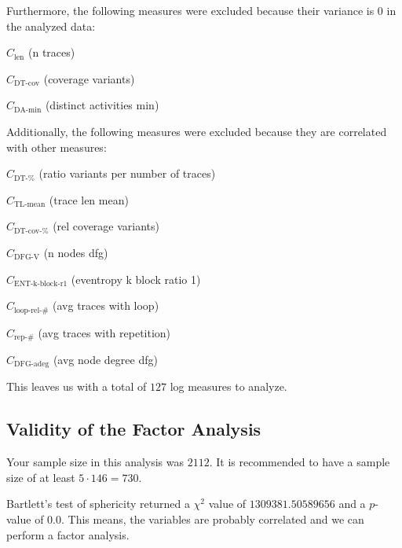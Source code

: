 \documentclass[a4paper]{article}
\newcommand{\lengthname}{\text{len}}
\newcommand{\length}{C_{\lengthname}}
\newcommand{\tlavgname}{\text{TL-mean}}
\newcommand{\tlavg}{C_{\tlavgname}}
\newcommand{\percentageuniquetracesname}{\text{DT-\%}}
\newcommand{\percentageuniquetraces}{C_{\percentageuniquetracesname}}
\newcommand{\dtcovname}{\text{DT-cov}}
\newcommand{\dtcov}{C_{\dtcovname}}
\newcommand{\dtrelcovname}{\text{DT-cov-\%}}
\newcommand{\dtrelcov}{C_{\dtrelcovname}}
\newcommand{\daminname}{\text{DA-min}}
\newcommand{\damin}{C_{\daminname}}
\newcommand{\looprelnumname}{\text{loop-rel-\#}}
\newcommand{\looprelnum}{C_{\looprelnumname}}
\newcommand{\repnumname}{\text{rep-\#}}
\newcommand{\reprelnum}{C_{\repnumname}}
\newcommand{\dfgnodesname}{\text{DFG-V}}
\newcommand{\dfgnodes}{C_{\dfgnodesname}}
\newcommand{\dfgavgdegname}{\text{DFG-adeg}}
\newcommand{\dfgavgdeg}{C_{\dfgavgdegname}}
\newcommand{\entkblockronename}{\text{ENT-k-block-r1}}
\newcommand{\entkblockrone}{C_{\entkblockronename}}
\begin{document}
\bigskip
\noindent
Furthermore, the following measures were excluded because their variance is $0$ in the analyzed data:
\begin{compactenum}
\item $\length$ (n traces)
\item $\dtcov$ (coverage variants)
\item $\damin$ (distinct activities min)
\end{compactenum}

\bigskip
\noindent
Additionally, the following measures were excluded because they are correlated with other measures:
\begin{compactenum}
\item $\percentageuniquetraces$ (ratio variants per number of traces)
\item $\tlavg$ (trace len mean)
\item $\dtrelcov$ (rel coverage variants)
\item $\dfgnodes$ (n nodes dfg)
\item $\entkblockrone$ (eventropy k block ratio 1)
\item $\looprelnum$ (avg traces with loop)
\item $\reprelnum$ (avg traces with repetition)
\item $\dfgavgdeg$ (avg node degree dfg)
\end{compactenum}

\bigskip
\noindent
This leaves us with a total of $127$ log measures to analyze.

\subsection*{Validity of the Factor Analysis}
Your sample size in this analysis was $2112$.
It is recommended to have a sample size of at least $5 \cdot 146 = 730$.

\noindent 
Bartlett's test of sphericity returned a $\chi^2$ value of $1309381.50589656$ and a $p$-value of $0.0$.
This means, the variables are probably correlated and we can perform a factor analysis.
\end{document}
